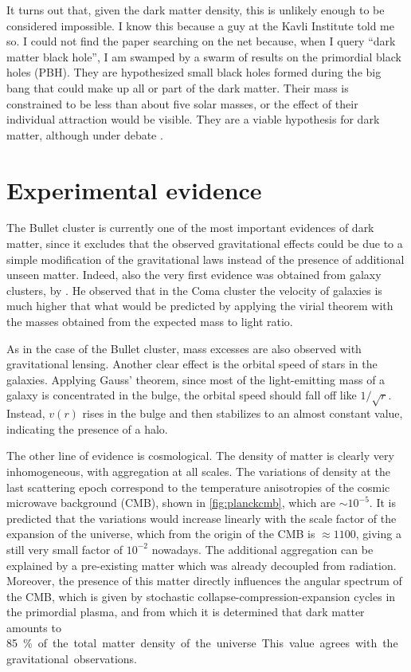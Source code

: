 It turns out that, given the dark matter density, this is unlikely enough to be
considered impossible. I know this because a guy at the Kavli Institute told me
so. I could not find the paper searching on the net because, when I query
``dark matter black hole'', I am swamped by a swarm of results on the
primordial black holes (PBH). They are hypothesized small black holes formed
during the big bang that could make up all or part of the dark matter. Their
mass is constrained to be less than about five solar masses, or the effect of
their individual attraction would be visible. They are a viable hypothesis for
dark matter, although under debate \cite[485]{zyla2020}.

\section{Experimental evidence}

The Bullet cluster is currently one of the most important evidences of dark
matter, since it excludes that the observed gravitational effects could be due
to a simple modification of the gravitational laws instead of the presence of
additional unseen matter. Indeed, also the very first evidence was obtained
from galaxy clusters, by \cite{zwicky1933}. He observed that in the Coma
cluster the velocity of galaxies is much higher that what would be predicted
by applying the virial theorem with the masses obtained from the expected mass
to light ratio.

As in the case of the Bullet cluster, mass excesses are also observed with
gravitational lensing. Another clear effect is the orbital speed of stars in
the galaxies. Applying Gauss' theorem, since most of the light-emitting mass
of a galaxy is concentrated in the bulge, the orbital speed should fall off
like $1/\sqrt r$. Instead, $v(r)$ rises in the bulge and then stabilizes to an
almost constant value, indicating the presence of a halo.

The other line of evidence is cosmological. The density of matter is clearly
very inhomogeneous, with aggregation at all scales. The variations of density
at the last scattering epoch correspond to the temperature anisotropies of the
cosmic microwave background (CMB), shown in \autoref{fig:planckcmb}, which are
$\sim10^{-5}$. It is predicted that the variations would increase linearly with
the scale factor of the expansion of the universe, which from the origin of the
CMB is $\approx1100$, giving a still very small factor of $10^{-2}$ nowadays.
The additional aggregation can be explained by a pre-existing matter which was
already decoupled from radiation. Moreover, the presence of this matter
directly influences the angular spectrum of the CMB, which is given by
stochastic collapse-compression-expansion cycles in the primordial plasma, and
from which it is determined that dark matter amounts to \SI{85}\% of the total
matter density of the universe. This value agrees with the gravitational
observations.

